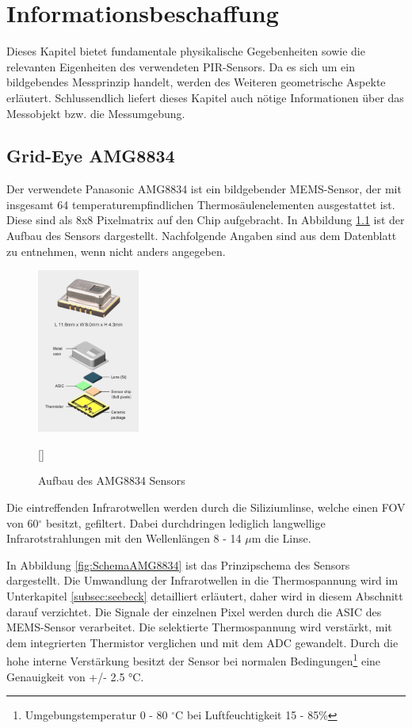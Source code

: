 \chapter{Informationsbeschaffung}
\label{chap:Informationsbeschaffung}
Dieses Kapitel bietet fundamentale physikalische Gegebenheiten sowie die relevanten Eigenheiten des verwendeten \ac{PIR}-Sensors. Da es sich um ein bildgebendes Messprinzip handelt, werden des Weiteren geometrische Aspekte erläutert. Schlussendlich liefert dieses Kapitel auch nötige Informationen über das Messobjekt bzw. die Messumgebung.

\section{Grid-Eye AMG8834}
\label{sec:AMG8834}

Der verwendete Panasonic AMG8834 ist ein bildgebender \ac{MEMS}-Sensor, der mit insgesamt 64 temperaturempfindlichen Thermosäulenelementen ausgestattet ist. Diese sind als 8x8 Pixelmatrix auf den Chip aufgebracht. In Abbildung \ref{fig:Explosionsdarstellung} ist der Aufbau des Sensors dargestellt. Nachfolgende Angaben sind aus dem Datenblatt zu entnehmen, wenn nicht anders angegeben.
 
\begin{figure}[H]
	\centering
	\includegraphics[width=0.3\textwidth]
	{fig/grid_eye_aufbau.PNG}
	\caption[Aufbau des AMG8834 Sensors]{Aufbau des AMG8834 Sensors} [\protect\cite{AMG8834}]
	\label{fig:Explosionsdarstellung}
\end{figure}
Die eintreffenden Infrarotwellen werden durch die Siliziumlinse, welche einen \ac{FOV} von 60$^\circ$ besitzt, gefiltert. Dabei durchdringen lediglich langwellige Infrarotstrahlungen mit den Wellenlängen 8 - 14 $\mu$m die Linse. 

In Abbildung \ref{fig:SchemaAMG8834} ist das Prinzipschema des Sensors dargestellt. Die Umwandlung der Infrarotwellen in die Thermospannung wird im Unterkapitel \ref{subsec:seebeck} detailliert erläutert, daher wird in diesem Abschnitt darauf verzichtet. Die Signale der einzelnen Pixel werden durch die \ac{ASIC} des \ac{MEMS}-Sensor verarbeitet. Die selektierte Thermospannung wird verstärkt, mit dem integrierten Thermistor verglichen und mit dem \ac{ADC} gewandelt. Durch die hohe interne Verstärkung besitzt der Sensor bei normalen Bedingungen\footnote[1]{Umgebungstemperatur 0 - 80 $^\circ$C bei Luftfeuchtigkeit 15 - 85\%} eine Genauigkeit von +/- 2.5 °C. 

